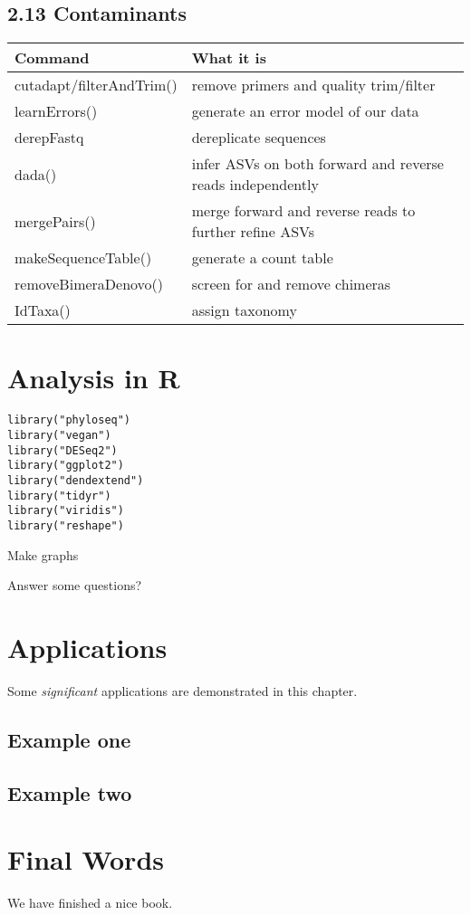 \documentclass[
]{book}
\begin{document}
\hypertarget{contaminants}{%
\section{2.13 Contaminants}\label{contaminants}}

\begin{longtable}{ll}
\toprule
\textbf{Command} & \textbf{What it is}\\
\midrule
cutadapt/filterAndTrim() & remove primers and quality trim/filter\\
learnErrors() & generate an error model of our data\\
derepFastq & dereplicate sequences\\
dada() & infer ASVs on both forward and reverse reads independently\\
mergePairs() & merge forward and reverse reads to further refine ASVs\\
\addlinespace
makeSequenceTable() & generate a count table\\
removeBimeraDenovo() & screen for and remove chimeras\\
IdTaxa() & assign taxonomy\\
\bottomrule
\end{longtable}

\hypertarget{analysis-in-r}{%
\chapter{Analysis in R}\label{analysis-in-r}}

\begin{verbatim}
library("phyloseq")
library("vegan")
library("DESeq2")
library("ggplot2")
library("dendextend")
library("tidyr")
library("viridis")
library("reshape")
\end{verbatim}

Make graphs

Answer some questions?

\hypertarget{applications}{%
\chapter{Applications}\label{applications}}

Some \emph{significant} applications are demonstrated in this chapter.

\hypertarget{example-one}{%
\section{Example one}\label{example-one}}

\hypertarget{example-two}{%
\section{Example two}\label{example-two}}

\hypertarget{final-words}{%
\chapter{Final Words}\label{final-words}}

We have finished a nice book.

  
\end{document}
